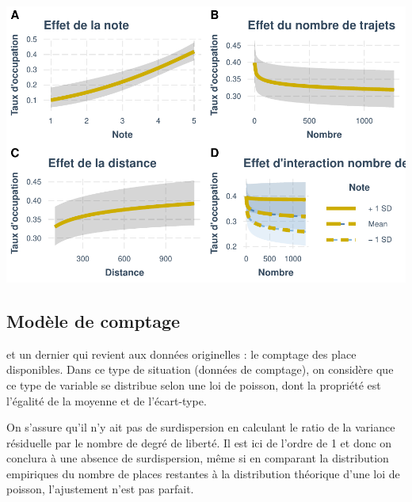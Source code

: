 \documentclass[
]{book}
\begin{document}
\includegraphics{bookdown-demo_files/figure-latex/0912-2.pdf}

\hypertarget{moduxe8le-de-comptage}{%
\subsection{Modèle de comptage}\label{moduxe8le-de-comptage}}

et un dernier qui revient aux données originelles : le comptage des place disponibles. Dans ce type de situation (données de comptage), on considère que ce type de variable se distribue selon une loi de poisson, dont la propriété est l'égalité de la moyenne et de l'écart-type.

On s'assure qu'il n'y ait pas de surdispersion en calculant le ratio de la variance résiduelle par le nombre de degré de liberté. Il est ici de l'ordre de 1 et donc on conclura à une absence de surdispersion, même si en comparant la distribution empiriques du nombre de places restantes à la distribution théorique d'une loi de poisson, l'ajustement n'est pas parfait.
\end{document}
